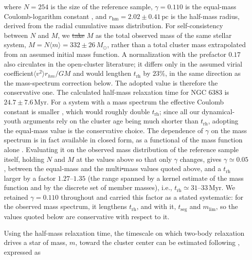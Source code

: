 \documentclass{aa}
\providecommand{\DIFaddtex}[1]{{\protect\color{red}\uwave{#1}}} %
\providecommand{\DIFdeltex}[1]{{\protect\color{red}\sout{#1}}} %
\providecommand{\DIFaddbegin}{} %
\providecommand{\DIFaddend}{} %
\providecommand{\DIFdelbegin}{} %
\providecommand{\DIFdelend}{} %
\providecommand{\DIFadd}[1]{\texorpdfstring{\DIFaddtex{#1}}{#1}} %
\providecommand{\DIFdel}[1]{\texorpdfstring{\DIFdeltex{#1}}{}} %
\providecommand{\DIFscaledelfig}{0.5}
\newlength{\DIFdelgraphicswidth} %
\newlength{\DIFdelgraphicsheight} %
\providecommand{\DIFaddincludegraphics}[2][]{{\color{blue}\fbox{\DIFOincludegraphics[#1]{#2}}}} %
\providecommand{\DIFdelincludegraphics}[2][]{%
\sbox{\DIFdelgraphicsbox}{\DIFOincludegraphics[#1]{#2}}%
\settoboxwidth{\DIFdelgraphicswidth}{\DIFdelgraphicsbox} %
\settoboxtotalheight{\DIFdelgraphicsheight}{\DIFdelgraphicsbox} %
\scalebox{\DIFscaledelfig}{%
\parbox[b]{\DIFdelgraphicswidth}{\usebox{\DIFdelgraphicsbox}\\[-\baselineskip] \rule{\DIFdelgraphicswidth}{0em}}\llap{\resizebox{\DIFdelgraphicswidth}{\DIFdelgraphicsheight}{%
\setlength{\unitlength}{\DIFdelgraphicswidth}%
\begin{picture}(1,1)%
\thicklines\linethickness{2pt} %
{\color[rgb]{1,0,0}\put(0,0){\framebox(1,1){}}}%
{\color[rgb]{1,0,0}\put(0,0){\line( 1,1){1}}}%
{\color[rgb]{1,0,0}\put(0,1){\line(1,-1){1}}}%
\end{picture}%
}\hspace*{3pt}}} %
} %
\DeclareRobustCommand{\DIFaddbegin}{\DIFOaddbegin \let\includegraphics\DIFaddincludegraphics} %
\DeclareRobustCommand{\DIFaddend}{\DIFOaddend \let\includegraphics\DIFOincludegraphics} %
\DeclareRobustCommand{\DIFdelbegin}{\DIFOdelbegin \let\includegraphics\DIFdelincludegraphics} %
\DeclareRobustCommand{\DIFdelend}{\DIFOaddend \let\includegraphics\DIFOincludegraphics} %
\begin{document}
where $N=254$ is the size of the reference sample, $\gamma = 0.110$ is the equal-mass Coulomb-logarithm constant \citep[not to be confused with the HDBSCAN density level $\lambda$ of Sect.~\ref{subsubsec:membership};][]{1994MNRAS.268..257G}, and $r_\mathrm{hm} = 2.02 \pm 0.41\,\mathrm{pc}$ is the half-mass radius, derived from the radial cumulative mass distribution. For self-consistency between $N$ and $M$, we \DIFdelbegin \DIFdel{take }\DIFdelend \DIFaddbegin \DIFadd{took }\DIFaddend $M$ as the total observed mass of the same stellar system, $M = N\langle m \rangle = 332 \pm 26\,M_\odot$, rather than a total cluster mass extrapolated from an assumed initial mass function. A normalization with the prefactor $0.17$ also circulates in the open-cluster literature; it differs only in the assumed virial coefficient\DIFaddbegin \DIFadd{, }\DIFaddend $\langle v^2\rangle r_{hm}/GM$ \citep[the value $0.4$ adopted here follows][]{1971ApJ...164..399S}\DIFaddbegin \DIFadd{, }\DIFaddend and would lengthen $t_{\mathrm{rh}}$ by $23\%$, in the same direction as the mass-spectrum correction below. The adopted value is therefore the conservative one. The calculated half-mass relaxation time for NGC 6383 is $24.7\pm 7.6\,\mathrm{Myr}$. For a system with a mass spectrum the effective Coulomb constant is smaller \citep[$\gamma\simeq0.02$;][]{1996MNRAS.279.1037G}, which would roughly double $t_{\mathrm{rh}}$; since all our dynamical-youth arguments rely on the cluster age being much shorter than $t_{\mathrm{rh}}$, adopting the equal-mass value is the conservative choice. The dependence of $\gamma$ on the mass spectrum is in fact available in closed form, as a functional of the mass function alone \citep[Eqs.~11 and 26]{1975IAUS...69..133H}. Evaluating it on the observed mass distribution of the reference sample itself, holding $N$ and $M$ at the values above so that only $\gamma$ changes, gives $\gamma\simeq0.05$, between the equal-mass and the multi\DIFdelbegin \DIFdel{-}\DIFdelend mass values quoted above, and a $t_{\mathrm{rh}}$ larger by a factor $1.27$--$1.35$ (the range spanned by a kernel estimate of the mass function and by the discrete set of member masses), i.e., $t_{\mathrm{rh}}\simeq31$--$33\,\mathrm{Myr}$. We retained $\gamma=0.110$ throughout and carried this factor as a stated systematic: for the observed mass spectrum, it lengthens $t_{\mathrm{rh}}$, and with it, $t_{\mathrm{seg}}$ and $m_{\mathrm{lim}}$, so the values quoted below are conservative with respect to it.

Using the half-mass relaxation time, the timescale on which two-body relaxation drives a star of mass, $m$, toward the cluster center can be estimated following \citet{1969ApJ...158L.139S}, expressed as
\end{document}
